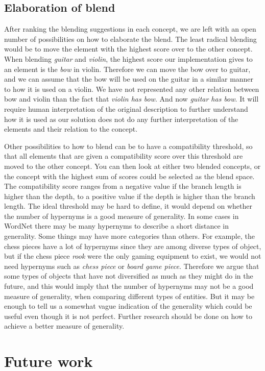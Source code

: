 \subsection{Elaboration of blend}
After ranking the blending suggestions in each concept, we are left with an open number of possibilities on how to elaborate the blend. The least radical blending would be to move the element with the highest score over to the other concept. When blending \emph{guitar} and \emph{violin}, the highest score our implementation gives to an element is the \emph{bow} in violin. Therefore we can move the bow over to guitar, and we can assume that the bow will be used on the guitar in a similar manner to how it is used on a violin. We have not represented any other relation between bow and violin than the fact that \emph{violin has bow}. And now \emph{guitar has bow}. It will require human interpretation of the original description to further understand how it is used as our solution does not do any further interpretation of the elements and their relation to the concept.

Other possibilities to how to blend can be to have a compatibility threshold, so that all elements that are given a compatibility score over this threshold are moved to the other concept. You can then look at either two blended concepts, or the concept with the highest sum of scores could be selected as the blend space. The compatibility score ranges from a negative value if the branch length is higher than the depth, to a positive value if the depth is higher than the branch length. The ideal threshold may be hard to define, it would depend on whether the number of hypernyms is a good measure of generality. In some cases in WordNet there may be many hypernyms to describe a short distance in generality. Some things may have more categories than others. For example, the chess pieces have a lot of hypernyms since they are among diverse types of object, but if the chess piece \emph{rook} were the only gaming equipment to exist, we would not need hypernyms such as \emph{chess piece} or \emph{board game piece}. Therefore we argue that some types of objects that have not diversified as much as they might do in the future, and this would imply that the number of hypernyms may not be a good measure of generality, when comparing different types of entities. But it may be enough to tell us a somewhat vague indication of the generality which could be useful even though it is not perfect. Further research should be done on how to achieve a better measure of generality.


\section{Future work}